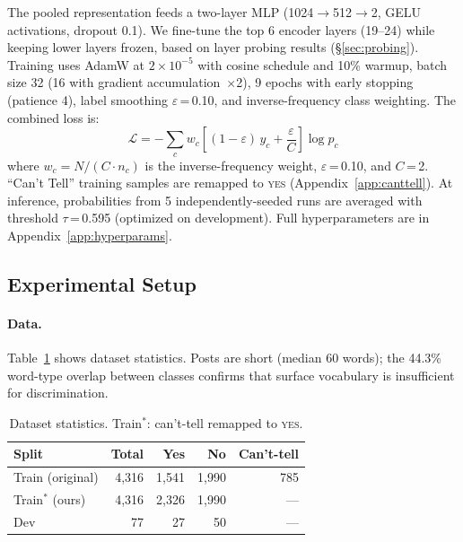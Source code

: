 \documentclass[11pt]{article}
\begin{document}
The pooled representation feeds a two-layer MLP
(1024$\to$512$\to$2, GELU activations, dropout 0.1).
We fine-tune the top 6 encoder layers (19--24) while keeping lower
layers frozen, based on layer probing results
(\S\ref{sec:probing}).
Training uses AdamW \citep{loshchilov2019adamw} at $2{\times}10^{-5}$
with cosine schedule and 10\% warmup, batch size 32 (16 with gradient
accumulation~$\times$2), 9 epochs with early stopping (patience 4),
label smoothing $\varepsilon$\,=\,0.10, and inverse-frequency class
weighting.
The combined loss is:
\begin{equation}
  \mathcal{L} = -\sum_{c} w_c \left[(1-\varepsilon)\,y_c
  + \frac{\varepsilon}{C}\right] \log p_c
  \label{eq:loss}
\end{equation}
where $w_c = N/(C \cdot n_c)$ is the inverse-frequency weight,
$\varepsilon$\,=\,0.10, and $C$\,=\,2.
``Can't Tell'' training samples are remapped to \textsc{yes}
(Appendix~\ref{app:canttell}).
At inference, probabilities from 5 independently-seeded runs are averaged
with threshold $\tau$\,=\,0.595 (optimized on development).
Full hyperparameters are in Appendix~\ref{app:hyperparams}.

\subsection{Experimental Setup}

\paragraph{Data.}
Table~\ref{tab:data} shows dataset statistics.
Posts are short (median 60 words); the 44.3\% word-type overlap between
classes confirms that surface vocabulary is insufficient for discrimination.

\begin{table}[t]
\centering\small
\begin{tabular}{@{}lrrrr@{}}
\toprule
\textbf{Split} & \textbf{Total} & \textbf{Yes} & \textbf{No} & \textbf{Can't-tell} \\
\midrule
Train (original) & 4,316 & 1,541 & 1,990 & 785 \\
Train$^*$ (ours) & 4,316 & 2,326 & 1,990 & --- \\
Dev              &    77 &    27 &    50 & --- \\
\bottomrule
\end{tabular}
\caption{Dataset statistics. Train$^*$: can't-tell remapped to \textsc{yes}.}
\label{tab:data}
\end{table}
\end{document}
